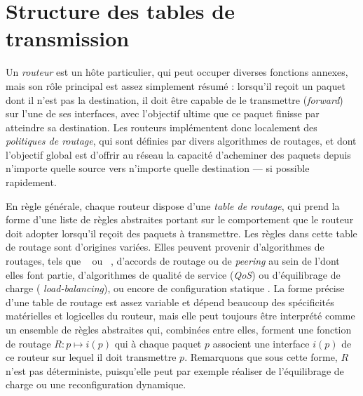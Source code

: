 \section{Structure des tables de transmission}
\label{sec:revtables-structure}

Un {\em routeur} est un hôte \LLL particulier, qui peut occuper diverses
fonctions annexes, mais son rôle principal est assez simplement résumé :
lorsqu'il reçoit un paquet dont il n'est pas la destination, il doit être
capable de le transmettre ({\em forward}) sur l'une de ses interfaces, avec
l'objectif ultime que ce paquet finisse par atteindre sa destination. Les
routeurs implémentent donc localement des {\em politiques de routage}, qui sont
définies par divers algorithmes de routages, et dont l'objectif global est
d'offrir au réseau la capacité d'acheminer des paquets depuis n'importe quelle
source vers n'importe quelle destination --- si possible rapidement.

En règle générale, chaque routeur dispose d'une {\em table de routage}, qui
prend la forme d'une liste de règles abstraites portant sur le comportement que
le routeur doit adopter lorsqu'il reçoit des paquets à transmettre. Les règles
dans cette table de routage sont d'origines variées. Elles peuvent provenir
d'algorithmes de routages, tels que \bgp~ ou \ospf~,
d'accords de routage ou de {\em peering} au sein de l'\as dont elles font
partie, d'algorithmes de qualité de service ({\em QoS}) ou d'équilibrage de charge ({\em
load-balancing}), ou encore de configuration statique \adhoc. La forme
précise d'une table de routage est assez variable et dépend beaucoup des
spécificités matérielles et logicelles du routeur, mais elle peut toujours être
interprété comme un ensemble de règles abstraites qui, combinées entre elles,
forment une fonction de routage $R : p \mapsto i(p)$ qui à chaque paquet $p$
associent une interface $i(p)$ de ce routeur sur lequel il doit transmettre $p$.
Remarquons que sous cette forme, $R$ n'est pas déterministe, puisqu'elle peut
par exemple réaliser de l'équilibrage de charge ou une reconfiguration
dynamique.

